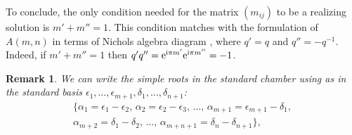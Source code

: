 \documentclass[10pt,a4paper]{amsart}
\numberwithin{equation}{section}
\newtheorem{oss}[teo]{Remark} }
\begin{document}
To conclude, the only condition needed for the matrix $(m_{ij})$ to be a realizing solution is $m' + m'' = 1$. This condition matches with the formulation of $A(m,n)$ in terms of Nichols algebra diagram \cite[Table~C, row 2]{Heck06}, where $q'=q$ and $q''= -q^{-1}$. Indeed, if $m' + m'' = 1$ then $q'q''={\rm e}^{{\rm i}\pi m'}{\rm e}^{{\rm i}\pi m''} =-1$.
\begin{oss} We can write the simple roots in the standard chamber using as in \cite{Kac77} the standard basis $\epsilon_1, \dots, \epsilon_{m+1}, \delta_1, \dots, \delta_{n+1}$:
\begin{gather*}
 \{ \alpha_1 = \epsilon_1-\epsilon_2, \,\alpha_2= \epsilon_2-\epsilon_3, \,\dots,\,  \alpha_{m+1}= \epsilon_{m+1}-\delta_1, \\
 \alpha_{m+2}=\delta_1-\delta_2, \,\dots,\,\alpha_{m+n+1}=\delta_n-\delta_{n+1} \},
\end{gather*}
\end{oss}
\end{document}
